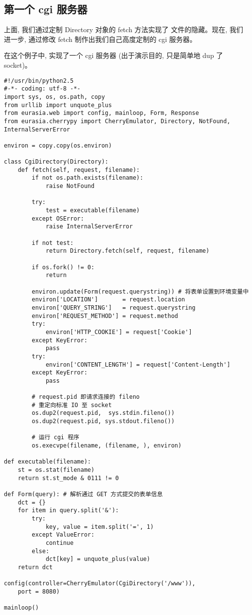 \documentclass{manual}
\begin{document}
\subsection{第一个 cgi 服务器}

上面, 我们通过定制 Directory 对象的 fetch 方法实现了  文件的隐藏。现在, 我们进一步, 通过修改 fetch 制作出我们自己高度定制的 cgi 服务器。

在这个例子中, 实现了一个 cgi 服务器 (出于演示目的, 只是简单地 dup 了 socket)。

\begin{verbatim}
#!/usr/bin/python2.5
#-*- coding: utf-8 -*-
import sys, os, os.path, copy
from urllib import unquote_plus
from eurasia.web import config, mainloop, Form, Response
from eurasia.cherrypy import CherryEmulator, Directory, NotFound, InternalServerError

environ = copy.copy(os.environ)

class CgiDirectory(Directory):
	def fetch(self, request, filename):
		if not os.path.exists(filename):
			raise NotFound

		try:
			test = executable(filename)
		except OSError:
			raise InternalServerError

		if not test:
			return Directory.fetch(self, request, filename)

		if os.fork() != 0:
			return

		environ.update(Form(request.querystring)) # 将表单设置到环境变量中
		environ['LOCATION']       = request.location
		environ['QUERY_STRING']   = request.querystring
		environ['REQUEST_METHOD'] = request.method
		try:
			environ['HTTP_COOKIE'] = request['Cookie']
		except KeyError:
			pass
		try:
			environ['CONTENT_LENGTH'] = request['Content-Length']
		except KeyError:
			pass

		# request.pid 即请求连接的 fileno
		# 重定向标准 IO 至 socket
		os.dup2(request.pid,  sys.stdin.fileno())
		os.dup2(request.pid, sys.stdout.fileno())

		# 运行 cgi 程序
		os.execvpe(filename, (filename, ), environ)

def executable(filename):
	st = os.stat(filename)
	return st.st_mode & 0111 != 0

def Form(query): # 解析通过 GET 方式提交的表单信息
	dct = {}
	for item in query.split('&'):
		try:
			key, value = item.split('=', 1)
		except ValueError:
			continue
		else:
			dct[key] = unquote_plus(value)
	return dct

config(controller=CherryEmulator(CgiDirectory('/www')),
	port = 8080)

mainloop()
\end{verbatim}
\end{document}
